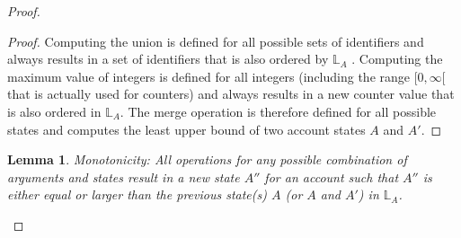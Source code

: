 \documentclass[9pt, oneside]{article}   	%
\newtheorem{lemma}{Lemma}
\begin{document}
\begin{proof}
\begin{proof}
Computing the union is defined for all possible sets of identifiers and always results in a set of identifiers that is also ordered by $\mathds{L}_A$ . Computing the maximum value of integers is defined for all integers (including the range $[0, \infty[$  that is actually used for counters) and always results in a new counter value that is also ordered in $\mathds{L}_A$. The merge operation is therefore defined for all possible states and computes the least upper bound of two account states $A$ and $A'$.
\end{proof}

\begin{lemma}
\textit{Monotonicity}: All operations for any possible combination of arguments and states result in a new state $A''$ for an account such that $A''$ is either equal or larger than the previous state(s) $A$ (or $A$ and $A'$) in $\mathds{L}_A$.
\end{lemma}


\end{proof}
\end{document}
